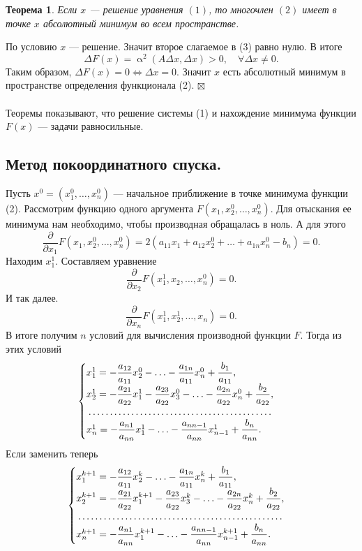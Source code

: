 \documentclass[a4paper, 12pt]{report}
\newenvironment{Proof} %
{\par\noindent{$\blacklozenge$}} %
{\hfill$\scriptstyle\boxtimes$}
\renewcommand{\alpha}{\upalpha}
\newtheorem*{theorem}{Теорема}
\begin{document}
	\begin{theorem}
		Если $x$ --- решение уравнения $(1)$, то многочлен $(2)$ имеет в точке $x$ абсолютный минимум во всем пространстве.
	\end{theorem}
	\begin{Proof}
		По условию $x$ --- решение. Значит второе слагаемое в (3) равно нулю. В итоге $$\Delta F(x) = \alpha^2(A\Delta x,\Delta x) > 0,\quad\forall \Delta x \ne 0.$$
		Таким образом, $\Delta F(x) = 0 \Longleftrightarrow \Delta x = 0$. Значит $x$ есть абсолютный минимум в пространстве определения функционала (2). 
	\end{Proof}\\\\
	Теоремы показывают, что решение системы (1) и нахождение минимума функции $F(x)$ --- задачи равносильные.
	\subsection{Метод покоординатного спуска.}
	Пусть $x^0 = (x_1^0,\ldots, x_n^0)$ --- начальное приближение в точке минимума функции (2). Рассмотрим функцию одного аргумента $F(x_1, x_2^0, \ldots, x_n^0)$. Для отыскания ее минимума нам необходимо, чтобы производная обращалась в ноль. А для этого $$\dfrac{\partial }{\partial x_1}F(x_1, x_2^0, \ldots, x_n^0) = 2(a_{11}x_1 + a_{12}x_2^0 + \ldots + a_{1n}x_n^0 - b_n) = 0.$$
	Находим $x_1^1$. Составляем уравнение $$\dfrac{\partial }{\partial x_2}F(x_1^1, x_2, \ldots, x_n^0)=0.$$
	И так далее.
	$$\dfrac{\partial }{\partial x_n}F(x_1^1, x_2^1, \ldots, x_n)=0.$$
	В итоге получим $n$ условий для вычисления производной функции $F$.
	Тогда из этих условий 
	$$\begin{cases}
		x_1^1 = -\dfrac{a_{12}}{a_{11}} x_2^0 - \ldots - \dfrac{a_{1n}}{a_{11}}x_n^0 + \dfrac{b_1}{a_{11}},\\
		x_2^1 = -\dfrac{a_{21}}{a_{22}} x_1^1 - \dfrac{a_{23}}{a_{22}}x_3^0 - \ldots - \dfrac{a_{2n}}{a_{22}}x_n^0 + \dfrac{b_2}{a_{22}},\\
		\dotfill\\
		x_n^1 =- \dfrac{a_{n1}}{a_{nn}}x_1^1 - \ldots - \dfrac{a_{nn-1}}{a_{nn}}x_{n-1}^1 + \dfrac{b_n}{a_{nn}}.
	\end{cases}$$
	Если заменить теперь
	$$\begin{cases}
		x_1^{k+1} = -\dfrac{a_{12}}{a_{11}} x_2^k - \ldots - \dfrac{a_{1n}}{a_{11}}x_n^k + \dfrac{b_1}{a_{11}},\\
		x_2^{k+1} = -\dfrac{a_{21}}{a_{22}} x_1^{k+1} - \dfrac{a_{23}}{a_{22}}x_3^k - \ldots - \dfrac{a_{2n}}{a_{22}}x_n^k + \dfrac{b_2}{a_{22}},\\
		\dotfill\\
		x_n^{k+1} =- \dfrac{a_{n1}}{a_{nn}}x_1^{k+1} - \ldots - \dfrac{a_{nn-1}}{a_{nn}}x_{n-1}^{k+1} + \dfrac{b_n}{a_{nn}}.
	\end{cases}$$
\end{document}
